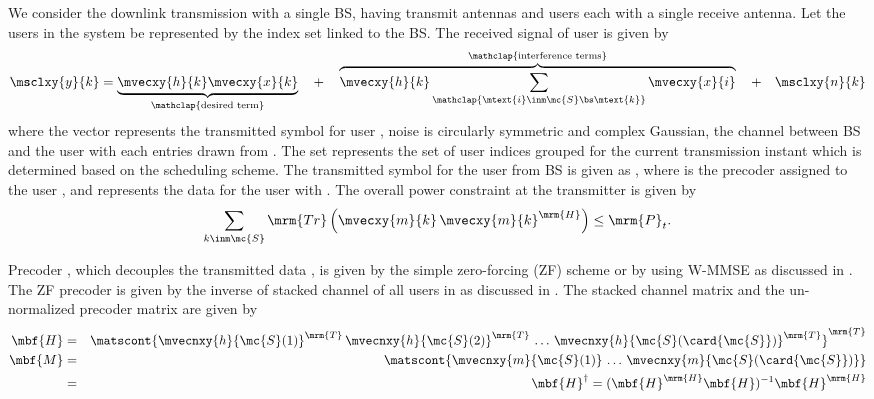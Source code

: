 
We consider the downlink transmission with a single BS, having  transmit antennas and  users each with a single receive antenna. Let the users in the system be represented by the index set  linked to the BS. The received signal  of user  is given by
\begin{eqnarray}
\msclxy{y}{k} = \underbrace{\mvecxy{h}{k} \mvecxy{x}{k}}_{\mathclap{\text{desired term}}} \quad + \quad \overbrace{ \mvecxy{h}{k} \sum_{\mathclap{\mtext{i} \inm \mc{S} \bs \mtext{k}}} \mvecxy{x}{i}}^{\mathclap{\text{interference terms}}} \quad + \quad \msclxy{n}{k}
\label{sm-e1}
\end{eqnarray}
where the vector  represents the transmitted symbol for user , noise  is circularly symmetric and complex Gaussian, the channel  between BS and the user  with each entries drawn from . The set  represents the set of user indices grouped for the current transmission instant which is determined based on the scheduling scheme. The transmitted symbol  for the user  from BS is given as , where  is the precoder assigned to the user , and  represents the data for the  user with . The overall power constraint at the transmitter is given by
\begin{equation}
\sum_{k \inm \mc{S}} \mrm{Tr} \left ( \mvecxy{m}{k} \, \mvecxy{m}{k}^{\mrm{H}} \right ) \leq \mrm{P}_{t}.
\label{sm-e2}
\end{equation}

Precoder , which decouples the transmitted data , is given by the simple zero-forcing (ZF) scheme or by using \ac{W-MMSE} as discussed in \cite{wmmse_shi}. The ZF precoder is given by the inverse of stacked channel of all users in  as discussed in \cite{spencer2004zero}. The stacked channel matrix  and the un-normalized precoder matrix  are given by
\begin{eqnarray}
\mbf{H} &=& \matscont{\mvecnxy{h}{\mc{S}(1)}^\mrm{T} \, \mvecnxy{h}{\mc{S}(2)}^\mrm{T} \, \dotsc \, \mvecnxy{h}{\mc{S}(\card{\mc{S}})}^\mrm{T}}^\mrm{T} \label{sm-e3:1} \\
\mbf{M} &=& \matscont{\mvecnxy{m}{\mc{S}(1)} \, \dotsc \, \mvecnxy{m}{\mc{S}(\card{\mc{S}})}} \nonumber \\
&=& \mbf{H}^{\dagger} = (\mbf{H}^\mrm{H} \mbf{H})^{-1}\mbf{H}^\mrm{H}
\label{sm-e3}
\end{eqnarray}

